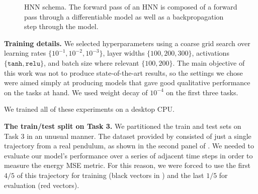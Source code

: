 \documentclass{article}
\begin{document}
\begin{figure}[H]
\begin{centering}
\hspace{1cm}
\end{centering}
\caption{HNN schema. The forward pass of an HNN is composed of a forward pass through a differentiable model as well as a backpropagation step through the model.}
\end{figure}

\textbf{Training details.} We selected hyperparameters using a coarse grid search over learning rates $\{10^{-1}, 10^{-2}, 10^{-3}\}$, layer widths $\{100, 200, 300\}$, activations $\{\texttt{tanh}, \texttt{relu}\}$, and batch size where relevant $\{100, 200\}$. The main objective of this work was not to produce state-of-the-art results, so the settings we chose were aimed simply at producing models that gave good qualitative performance on the tasks at hand. We used weight decay of $10^{-4}$ on the first three tasks.

We trained all of these experiments on a desktop CPU.

\textbf{The train/test split on Task 3.} We partitioned the train and test sets on Task 3 in an unusual manner. The dataset provided by \cite{Schmidt2009Distilling} consisted of just a single trajectory from a real pendulum, as shown in the second panel of . We needed to evaluate our model's performance over a series of adjacent time steps in order to measure the energy MSE metric. For this reason, we were forced to use the first $4/5$ of this trajectory for training (black vectors in ) and the last $1/5$ for evaluation (red vectors).
\end{document}
